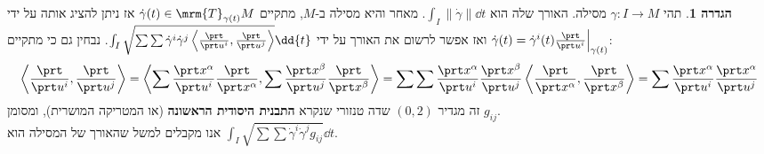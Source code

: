 \documentclass{article}
\theoremstyle{definition}
\newtheorem*{definition*}{הגדרה}
\newcommand{\norm}[1]{\left\lVert#1\right\rVert}
\begin{document}
	\begin{definition*}
		תהי
		\(\gamma: I \to M\)
		מסילה.
		האורך שלה הוא
		\(\int_I \norm{\dot\gamma} \dd{t}\).
		מאחר והיא מסילה ב-\(M\), מתקיים
		\(\dot\gamma(t) \in \mrm{T}_{\gamma(t)} M\)
		אז ניתן להציג אותה על ידי
		\(\dot\gamma(t)=\dot{\gamma}^i(t) \frac{\prt}{\prt u^i}\Big|_{\gamma(t)} \)
		ואז אפשר לרשום את האורך על ידי
		\(\int_I \sqrt{
			\sum \sum \dot{\gamma}^i \dot{\gamma}^j \left\langle \frac{\prt}{\prt u^i},\frac{\prt}{\prt u^j} \right\rangle
		} \dd{t}\).
		נבחין גם כי מתקיים:
		\[
			\left\langle \frac{\prt}{\prt u^i},\frac{\prt}{\prt u^j} \right\rangle
			=
			\left\langle
				\sum \frac{\prt x^\alpha}{\prt u^i} \frac{\prt}{\prt x^\alpha},
				\sum \frac{\prt x^\beta}{\prt u^j} \frac{\prt}{\prt x^\beta}
			\right\rangle
			=
			\sum \sum \frac{\prt x^\alpha}{\prt u^i} \frac{\prt x^\beta}{\prt u^j}
			\left\langle \frac{\prt}{\prt x^\alpha}, \frac{\prt}{\prt x^\beta} \right\rangle
			=
			\sum \frac{\prt x^\alpha}{\prt u^i} \frac{\prt x^\alpha}{\prt u^j}
		\]
		זה מגדיר
		\((0,2)\)
		שדה טנזורי שנקרא \textbf{התבנית היסודית הראשונה} (או המטריקה המושרית), ומסומן
		\(g_{ij}\).
		\\
		אנו מקבלים למשל שהאורך של המסילה הוא
		\(\int_I \sqrt{
			\sum \sum \dot{\gamma}^i \dot{\gamma}^j g_{ij}
		} \dd{t}\).
	\end{definition*}
	
\end{document}
